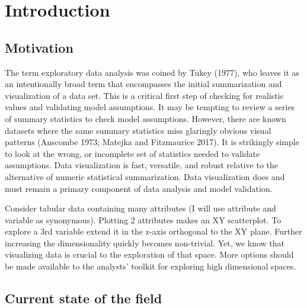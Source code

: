 \documentclass[
  11,
]{article}
\begin{document}
\newpage

% 

\doublespacing

\newpage
{}
\hypersetup{linkcolor = blue}

{
\hypersetup{linkcolor=}
\setcounter{tocdepth}{2}
\tableofcontents
}
\hypertarget{sec:intro}{%
\section{Introduction}\label{sec:intro}}

\hypertarget{motivation}{%
\subsection{Motivation}\label{motivation}}

The term exploratory data analysis was coined by Tukey (1977), who leaves it as an intentionally broad term that encompasses the initial summarization and visualization of a data set. This is a critical first step of checking for realistic values and validating model assumptions. It may be tempting to review a series of summary statistics to check model assumptions. However, there are known datasets where the same summary statistics miss glaringly obvious visual patterns (Anscombe 1973; Matejka and Fitzmaurice 2017). It is strikingly simple to look at the wrong, or incomplete set of statistics needed to validate assumptions. Data visualization is fast, versatile, and robust relative to the alternative of numeric statistical summarization. Data visualization does and must remain a primary component of data analysis and model validation.

Consider tabular data containing many attributes (I will use attribute and variable as synonymous). Plotting 2 attributes makes an XY scatterplot. To explore a 3rd variable extend it in the z-axis orthogonal to the XY plane. Further increasing the dimensionality quickly becomes non-trivial. Yet, we know that visualizing data is crucial to the exploration of that space. More options should be made available to the analysts' toolkit for exploring high dimensional spaces.

\hypertarget{current-state-of-the-field}{%
\subsection{Current state of the field}\label{current-state-of-the-field}}
\end{document}
